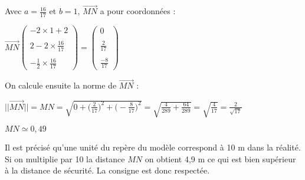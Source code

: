\documentclass{article}
\begin{document}
\vspace{2mm}

\noindent Avec $a = \frac{16}{17}$ et $b = 1$, $\overrightarrow{MN}$ a pour coordonnées :

\vspace{4mm}

$\overrightarrow{MN}\begin{pmatrix}
   -2 \times 1 + 2\\
   \\
   2 - 2 \times \displaystyle\frac{16}{17}\\
   \\
   -\frac{1}{2}\times\displaystyle\frac{16}{17}
\end{pmatrix}
= 
\begin{pmatrix}
   0\\
   \\
   \displaystyle\frac{2}{17}\\
   \\
   \displaystyle\frac{-8}{17}
\end{pmatrix}
$

\vspace{4mm}

\noindent On calcule ensuite la norme de $\overrightarrow{MN}$ :

\vspace{2mm}

$||\overrightarrow{MN}|| = MN = \sqrt{0 + \Big(\displaystyle\frac{2}{17}\Big)^2 + \Big(-\frac{8}{17}\Big)^2} = \sqrt{\displaystyle\frac{4}{289} + \frac{64}{289}} = \sqrt{\displaystyle\frac{4}{17}} = \displaystyle\frac{2}{\sqrt{17}}$

\vspace{2mm}

$MN \simeq 0,49$

\vspace{2mm}

\noindent Il est précisé qu'une unité du repère du modèle correspond à 10 m dans la réalité. Si on multiplie par 10 la distance $MN$ on obtient 4,9 m ce qui est bien supérieur à la distance de sécurité. La consigne est donc respectée.
\end{document}
